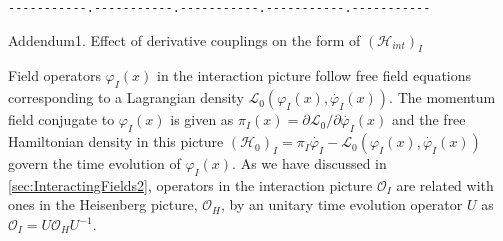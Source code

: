 \verb/-----------.-----------.-----------.-----------.-----------/\\
\vspace{-3mm}
{\small
\begin{center}
Addendum1. Effect of derivative couplings on the form of $(\mathcal{H}_{int})_I$
\end{center}

Field operators $\varphi_I (x)$ in the interaction picture follow free field equations 
corresponding to a Lagrangian density $\mathcal{L}_{0}(\varphi_I (x), \dot{\varphi_I} (x))$.
The momentum field conjugate to $\varphi_I (x)$ is given as
$\pi_I (x) = \partial \mathcal{L}_0 / \partial \dot{\varphi_I} (x)$
and the free Hamiltonian density in this picture
$(\mathcal{H}_0)_I = \pi_I \dot{\varphi_I} -  \mathcal{L}_{0}(\varphi_I (x), \dot{\varphi_I} (x))$
govern the time evolution of $\varphi_I (x)$.
As we have discussed in \ref{sec:InteractingFields2},
operators in the interaction picture $\mathcal{O}_I$ are related with
ones in the Heisenberg picture, $\mathcal{O}_H$, by an unitary time evolution 
operator $U$ as $\mathcal{O}_I = U \mathcal{O}_H U^{-1}$.

}
